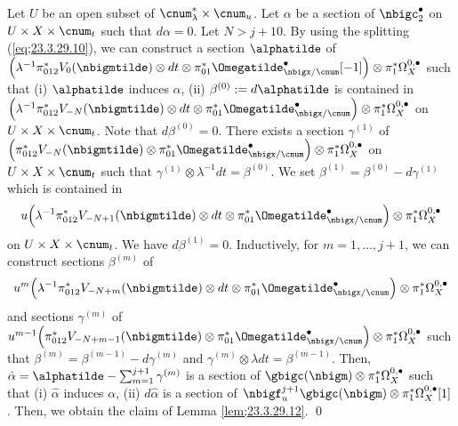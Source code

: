 \documentclass[a4,10pt]{article}
\begin{document}
Let $U$ be an open subset of $\cnum_{\lambda}^{\ast}\times\cnum_u$.
Let $\alpha$ be a section of $\nbigc_2^{\bullet}$
on $U\times X\times\cnum_t$ such that $d\alpha=0$.
Let $N>j+10$.
By using the splitting (\ref{eq;23.3.29.10}),
we can construct a section $\alphatilde$
of
$\Bigl(
\lambda^{-1}\pi_{012}^{\ast}V_{0}(\nbigmtilde)
\otimes dt
\otimes
\pi_{01}^{\ast}\Omegatilde^{\bullet}_{\nbigx/\cnum}[-1]
\Bigr)
\otimes\pi_1^{\ast}\Omega^{0,\bullet}_X$
such that
(i) $\alphatilde$ induces $\alpha$,
(ii)
$\beta^{(0)}:=d\alphatilde$
is contained in
$\Bigl(
\lambda^{-1}
\pi_{012}^{\ast}
V_{-N}(\nbigmtilde)\otimes dt\otimes
\pi_{01}^{\ast}\Omegatilde^{\bullet}_{\nbigx/\cnum}
\Bigr) \otimes\pi_1^{\ast}\Omega_X^{0,\bullet}$
on $U\times X\times\cnum_t$.
Note that $d\beta^{(0)}=0$.
There exists a section
$\gamma^{(1)}$
of
$\Bigl(
\pi_{012}^{\ast}
V_{-N}(\nbigmtilde)\otimes
\pi_{01}^{\ast}\Omegatilde^{\bullet}_{\nbigx/\cnum}
\Bigr) \otimes\pi_1^{\ast}\Omega_X^{0,\bullet}$
on $U\times X\times\cnum_t$
such that
$\gamma^{(1)}\otimes \lambda^{-1}dt=\beta^{(0)}$.
We set
$\beta^{(1)}=\beta^{(0)}-d\gamma^{(1)}$
which is contained in
\[
 u\Bigl(
\lambda^{-1}
\pi_{012}^{\ast}
V_{-N+1}(\nbigmtilde)\otimes dt\otimes
\pi_{01}^{\ast}\Omegatilde^{\bullet}_{\nbigx/\cnum}
\Bigr) \otimes\pi_1^{\ast}\Omega_X^{0,\bullet}
\]
on $U\times X\times\cnum_t$.
We have $d\beta^{(1)}=0$.
Inductively,
for $m=1,\ldots,j+1$,
we can construct sections
$\beta^{(m)}$
of 
\[
u^m\Bigl(
\lambda^{-1}
\pi_{012}^{\ast}
V_{-N+m}(\nbigmtilde)\otimes dt\otimes
\pi_{01}^{\ast}\Omegatilde^{\bullet}_{\nbigx/\cnum}
\Bigr) \otimes \pi_1^{\ast}\Omega_X^{0,\bullet}
\]
and sections
$\gamma^{(m)}$
of
$u^{m-1}\Bigl(
\pi_{012}^{\ast}
V_{-N+m-1}(\nbigmtilde)\otimes
\pi_{01}^{\ast}\Omegatilde^{\bullet}_{\nbigx/\cnum}
\Bigr) \otimes\pi_1^{\ast}\Omega_X^{0,\bullet}$
such that
$\beta^{(m)}=\beta^{(m-1)}-d\gamma^{(m)}$
and
$\gamma^{(m)}\otimes \lambda dt=\beta^{(m-1)}$.
Then, 
$\hat{\alpha}=\alphatilde-\sum_{m=1}^{j+1} \gamma^{(m)}$
is a section of
$\gbigc(\nbigm)\otimes\pi_1^{\ast}\Omega_X^{0,\bullet}$
such that
(i) $\hat{\alpha}$ induces $\alpha$,
(ii) $d\hat{\alpha}$
is a section of
$\nbigf_u^{j+1}\gbigc(\nbigm)\otimes\pi_1^{\ast}\Omega_X^{0,\bullet}[1]$.
Then, we obtain
the claim of Lemma \ref{lem;23.3.29.12}.
\hfill\qed
\end{document}
